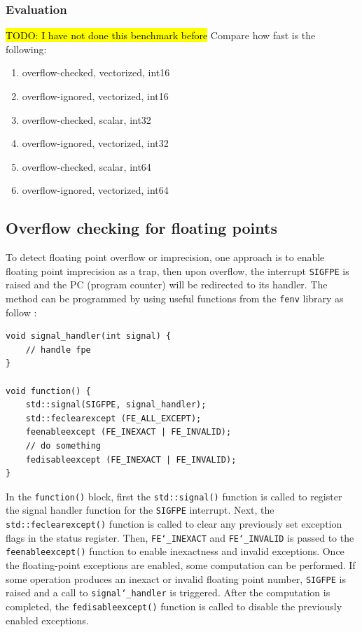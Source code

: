 \documentclass[logo,bsc,singlespacing,parskip]{infthesis}
\newcommand{\sigfpe}{\texttt{SIGFPE}}
\newcommand{\feinexact}{\texttt{FE\char`_INEXACT}}
\newcommand{\feinvalid}{\texttt{FE\char`_INVALID}}
\newenvironment{compactlist}
{ \begin{enumerate}
    \setlength{\itemsep}{0pt}
    \setlength{\parskip}{0pt}
    \setlength{\parsep}{0pt}     
}
{ \end{enumerate} }
\begin{document}
\subsubsection{Evaluation}
\hl{TODO: I have not done this benchmark before}
Compare how fast is the following:
\small

\begin{compactlist}
    \item overflow-checked, vectorized, int16
    \item overflow-ignored, vectorized, int16
    \item overflow-checked, scalar, int32
    \item overflow-ignored, vectorized, int32
    \item overflow-checked, scalar, int64
    \item overflow-ignored, vectorized, int64
\end{compactlist}
\normalsize

\subsection{Overflow checking for floating points}
\label{sec:overflow-float}
To detect floating point overflow or imprecision, one approach is to enable
floating point imprecision as a trap, then upon overflow, the interrupt \sigfpe{}
is raised and the PC (program counter) will be redirected to its handler. The
method can be programmed by using useful functions from the \texttt{fenv}
library as follow \cite{fenvlib}:
\begin{verbatim}
void signal_handler(int signal) {
    // handle fpe
}

void function() {
    std::signal(SIGFPE, signal_handler);
    std::feclearexcept (FE_ALL_EXCEPT);
    feenableexcept (FE_INEXACT | FE_INVALID);
    // do something
    fedisableexcept (FE_INEXACT | FE_INVALID);
}
\end{verbatim}

In the \texttt{function()} block, first the \texttt{std::signal()} function is
called to register the signal handler function for the \sigfpe{} interrupt. Next,
the \texttt{std::feclearexcept()} function is called to clear any previously set
exception flags in the status register. Then, \feinexact{} and \feinvalid{} is
passed to the \texttt{feenableexcept()} function to enable inexactness and
invalid exceptions. Once the floating-point exceptions are enabled, some
computation can be performed. If some operation produces an inexact or invalid
floating point number, \sigfpe{} is raised and a call to
\texttt{signal\char`_handler} is triggered. After the computation is completed,
the \texttt{fedisableexcept()} function is called to disable the previously
enabled exceptions. 
\end{document}
